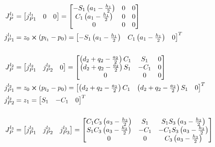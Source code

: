 \hspace{-0.75cm}
\begin{minipage}[h]{0.6\textwidth}
\begin{align*}
J_P^{l_1}&=\begin{bmatrix}
j_{P1}^{l_1} & 0 & 0
\end{bmatrix}=\begin{bmatrix}
-S_1\left(a_1 -\frac{h_1}{2}\right)&0&0\\C_1\left(a_1 -\frac{h_1}{2}\right)&0&0\\0&0&0
\end{bmatrix}\\
j_{P1}^{l_1}&=z_0\cross(p_{l_1}-p_{0})=\begin{bmatrix}
-S_1\left(a_1 -\frac{h_1}{2}\right)&C_1\left(a_1 -\frac{h_1}{2}\right)&0\end{bmatrix}^T\\\\
J_P^{l_2}&=\begin{bmatrix}
j_{P1}^{l_2} & j_{P2}^{l_2} & 0
\end{bmatrix}=\begin{bmatrix}
\left(d_2 + q_2-\frac{a_2}{2}\right)C_1&  S_1& 0\\
\left(d_2 + q_2-\frac{a_2}{2}\right)S_1& -C_1& 0\\
                                    0&    0& 0
\end{bmatrix}\\
j_{P1}^{l_2}&=z_0\cross(p_{l_2}-p_{0})=\begin{bmatrix}
\left(d_2 + q_2-\frac{a_2}{2}\right)C_1 &
\left(d_2 + q_2-\frac{a_2}{2}\right)S_1 &
                                    0
\end{bmatrix}^T\\
j_{P2}^{l_2}&=z_1=\begin{bmatrix}
 S_1&-C_1&   0
\end{bmatrix}^T\\\\
J_P^{l_3}&=\begin{bmatrix}
j_{P1}^{l_3} & j_{P2}^{l_3} &j_{P3}^{l_3}
\end{bmatrix}=\begin{bmatrix}
C_1C_3\left(a_3-\frac{h_3}{2}\right)&S_1&  S_1S_3\left(a_3-\frac{h_3}{2}\right)\\
S_1C_3\left(a_3-\frac{h_3}{2}\right)&-C_1& -C_1S_3\left(a_3-\frac{h_3}{2}\right)\\ 
                                      0  &  0  &             C_3\left(a_3-\frac{h_3}{2}\right)         

\end{bmatrix}
\end{align*}
\end{minipage}
